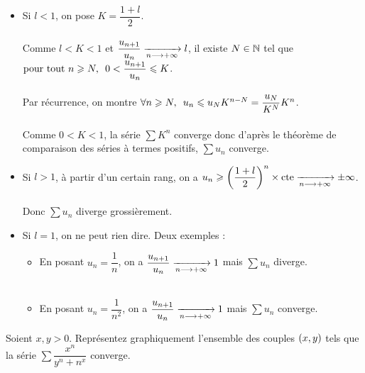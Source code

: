 \begin{dem}
\begin{itemize}
    \item Si \(l<1\), on pose \(K=\dfrac{1+l}{2}\). \\\\ Comme \(l<K<1\) et \(\dfrac{u_{n+1}}{u_n}\xrightarrow[n\longrightarrow+\infty]{}l\), il existe \(N\in\mathbb{N}\) tel que \(\quantifs{\tpt n\geq N}0<\dfrac{u_{n+1}}{u_n}\leq K\). \\\\ Par récurrence, on montre \(\quantifs{\forall n\geq N}u_n\leq u_NK^{n-N}=\dfrac{u_N}{K^N}K^n\). \\\\ Comme \(0<K<1\), la série \(\sum K^n\) converge donc d'après le théorème de comparaison des séries à termes positifs, \(\sum u_n\) converge. \\
    \item Si \(l>1\), à partir d'un certain rang, on a \(u_n\geqslant\left(\dfrac{1+l}{2}\right)^n\times\mathrm{cte}\xrightarrow[n\longrightarrow+\infty]{}\pm\infty\). \\\\ Donc \(\sum u_n\) diverge grossièrement. \\
    \item Si \(l=1\), on ne peut rien dire. Deux exemples : \\ \begin{itemize}
        \item En posant \(u_n=\dfrac{1}{n}\), on a \(\dfrac{u_{n+1}}{u_n}\xrightarrow[n\longrightarrow+\infty]{}1\) mais \(\sum u_n\) diverge. \\\\
        \item En posant \(u_n=\dfrac{1}{n^2}\), on a \(\dfrac{u_{n+1}}{u_n}\xrightarrow[n\longrightarrow+\infty]{}1\) mais \(\sum u_n\) converge.
    \end{itemize}
\end{itemize}
\end{dem}

\begin{exo}
Soient \(x,y>0\). Représentez graphiquement l'ensemble des couples \(\left(x,y\right)\) tels que la série \(\sum\dfrac{x^n}{y^n+n^x}\) converge.
\end{exo}

